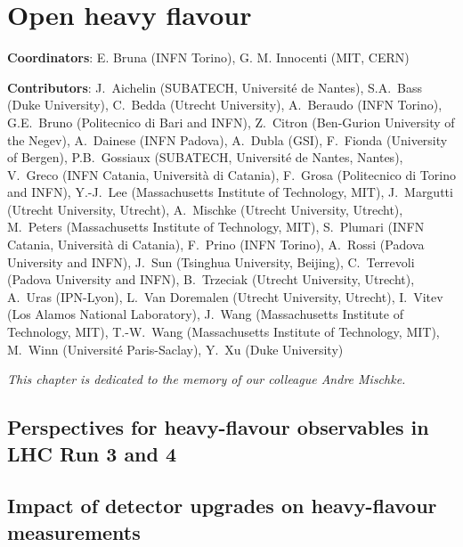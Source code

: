 \documentclass[../report.tex]{subfiles}
\providecommand{\main}{..}
\begin{document}
\clearpage
\section{Open heavy flavour}
\label{sec:HI_HF}

{ \small
\noindent 
\textbf{Coordinators}: E. Bruna (INFN Torino), G. M. Innocenti (MIT, CERN)

\noindent \textbf{Contributors}: 
J.~Aichelin (SUBATECH, Universit\'e de Nantes),
S.A.~Bass (Duke University),
C.~Bedda (Utrecht University),
A.~Beraudo (INFN Torino),
G.E.~Bruno (Politecnico di Bari and INFN), 
Z.~Citron (Ben-Gurion University of the Negev),
A.~Dainese (INFN Padova),
A.~Dubla (GSI),
F.~Fionda (University of Bergen),
P.B.~Gossiaux (SUBATECH, Universit\'e de Nantes, Nantes),
V.~Greco (INFN Catania, Universit\`a di Catania),
F.~Grosa (Politecnico di Torino and INFN),
Y.-J.~Lee (Massachusetts Institute of Technology, MIT),
J.~Margutti (Utrecht University, Utrecht),
A.~Mischke (Utrecht University, Utrecht),
M.~Peters (Massachusetts Institute of Technology, MIT),
S.~Plumari (INFN Catania, Universit\`a di Catania),
F.~Prino (INFN Torino),
A.~Rossi (Padova University and INFN),
J.~Sun (Tsinghua University, Beijing),
C.~Terrevoli (Padova University and INFN),
B.~Trzeciak (Utrecht University, Utrecht),
A.~Uras (IPN-Lyon),
L.~Van Doremalen (Utrecht University, Utrecht),
I.~Vitev (Los Alamos National Laboratory),
J.~Wang (Massachusetts Institute of Technology, MIT),
T.-W.~Wang (Massachusetts Institute of Technology, MIT),
M.~Winn (Universit\'e Paris-Saclay),
Y.~Xu (Duke University)
}

\vspace{3mm}
\begin{center}
{\em This chapter is dedicated to the memory of our colleague Andre Mischke.}
\end{center}


\subsection{Perspectives for heavy-flavour observables in LHC Run 3 and 4}


\subsection{Impact of detector upgrades on heavy-flavour measurements}

\end{document}
